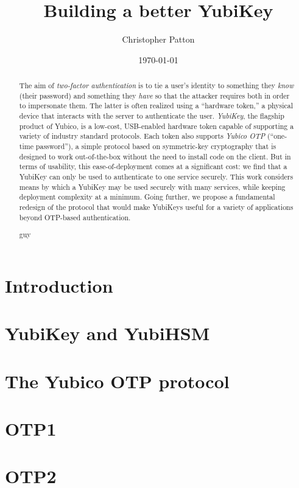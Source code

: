 \documentclass{build/llncs}
\date{\today}
\title{Building a better YubiKey}
\author{Christopher Patton}
\institute{University of Florida}
\begin{document}
\maketitle

\begin{abstract}
  The aim of \emph{two-factor authentication} is to tie a user's identity to
  something they \emph{know} (their password) and something they \emph{have} so
  that the attacker requires both in order to impersonate them.
  The latter is often realized using a ``hardware token,'' a physical device
  that interacts with the server to authenticate the user.
  \emph{YubiKey}, the flagship product of Yubico, is a low-cost, USB-enabled
  hardware token capable of supporting a variety of industry standard protocols.
  Each token also supports \emph{Yubico OTP} (``one-time password''), a simple
  protocol based on symmetric-key cryptography that is designed to work
  out-of-the-box without the need to install code on the client.
  But in terms of usability, this ease-of-deployment comes at a significant
  cost: we find that a YubiKey can only be used to authenticate to one service
  securely.
  This work considers means by which a YubiKey may be used securely with many
  services, while keeping deployment complexity at a minimum.
  Going further, we propose a fundamental redesign of the protocol that would
  make YubiKeys useful for a variety of applications beyond OTP-based
  authentication.
  \begin{keywords}
    guy
  \end{keywords}
\end{abstract}

\section{Introduction}


\section{YubiKey and YubiHSM}


\section{The Yubico OTP protocol}


\section{OTP1}


\section{OTP2}


\ifnum{}
 
 \else

\fi

\end{document}
